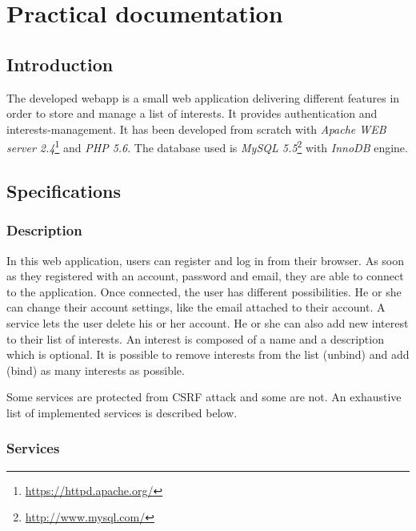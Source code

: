 \documentclass[a4paper,11pt,openany]{report}
\begin{document}
\appendix
{}

\chapter{Practical documentation} \label{app:practical_documentation}

\section{Introduction}
The developed webapp is a small web application delivering different features 
in order to store and manage a list of interests. It provides authentication and 
interests-management. It has been developed from scratch with \textit{Apache 
WEB server 2.4}\footnote{\url{https://httpd.apache.org/}} and \textit{PHP 5.6}. 
The database used is \textit{MySQL 5.5}\footnote{\url{http://www.mysql.com/}} with 
\textit{InnoDB} engine.

\section{Specifications}

\subsection{Description}

In this web application, users can register and log in from their browser. As soon as 
they registered with an account, password and email, they are able to connect to 
the application. Once connected, the user has different possibilities. He or she can 
change their account settings, like the email attached to their account. A service lets the 
user delete his or her account. He or she can also add new interest to their list of 
interests. An interest is composed of a name and a description which is optional. It is 
possible to remove interests from the list (unbind) and add (bind) as many interests as 
possible.

Some services are protected from CSRF attack and some are not. An exhaustive list of implemented 
services is described below.

\subsection{Services}
\end{document}
